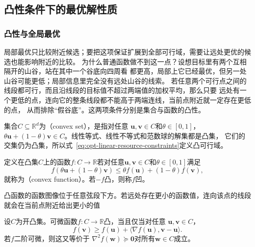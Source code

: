 \noindent\begin{minipage}{\linewidth}
\subsection{凸性条件下的最优解性质}
\label{sec:opt-convexity}

\subsubsection{凸性与全局最优}

局部最优只比较附近候选；要把这项保证扩展到全部可行域，需要让远处更优的候选也能影响附近的比较。
为什么普通函数做不到这一点？设想目标里有两个互相隔开的山谷，站在其中一个谷底向四周看
都更高，局部上它已经最优，但另一处山谷可能更低；局部信息里完全没有远处山谷的线索。
若任意两个可行点之间的线段都可行，而且沿线段的目标值不超过两端值的加权平均，那么只要
远处有一个更低的点，连向它的整条线段都不能高于两端连线，当前点附近就一定存在更低的点，
从而排除“假谷底”。这两项条件分别是集合与函数的凸性。
\end{minipage}\par
\begin{definition}[凸集与凸函数]
\label{def:opt-convex-set-function}
集合$C\subseteq\mathbb R^d$为（convex set），是指对任意
$\bm{u},\bm{v}\in C$和$\theta\in[0,1]$，
$\theta\bm{u}+(1-\theta)\bm{v}\in C$。线性等式、线性不等式和范数球的解集都是凸集，
它们的交集仍为凸集，所以式~\eqref{eq:opt-linear-resource-constraints}定义凸可行域。

定义在凸集$C$上的函数$f:C\to\mathbb R$若对任意$\bm u,\bm v\in C$和$\theta\in[0,1]$满足
\begin{equation}
  f(\theta\bm{u}+(1-\theta)\bm{v})
  \leq
  \theta f(\bm{u})+(1-\theta)f(\bm{v}),
  \label{eq:opt-convex-function}
\end{equation}
就称为（convex function）。若$-f$凸，则称$f$凹。
\end{definition}
凸函数的函数图像位于任意弦段下方。若远处存在更小的函数值，连向该点的线段就会在当前点附近给出更小的值

\begin{theorem}[凸函数的一阶与二阶判据]
\label{thm:opt-convexity-criteria}
设$C$为开凸集。可微函数$f:C\to\mathbb{R}$凸，当且仅当对任意
$\bm{u},\bm{v}\in C$，
\begin{equation}
  f(\bm{v})\geq f(\bm{u})
  +\langle\nabla f(\bm{u}),\bm{v}-\bm{u}\rangle.
  \label{eq:opt-first-order-convexity}
\end{equation}
若$f$二阶可微，则这又等价于
$\nabla^2f(\bm{w})\succeq\bm{0}$对所有$\bm{w}\in C$成立。
\end{theorem}

